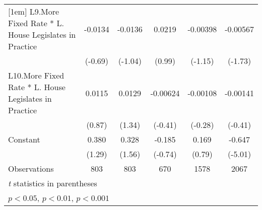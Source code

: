 {\begin{longtable}{l*{5}{c}}
[1em]
L9.More Fixed Rate * L. House Legislates in Practice&  -0.0134         &  -0.0136         &   0.0219         & -0.00398         & -0.00567         \\
                &  (-0.69)         &  (-1.04)         &   (0.99)         &  (-1.15)         &  (-1.73)         \\
[1em]
L10.More Fixed Rate * L. House Legislates in Practice&   0.0115         &   0.0129         & -0.00624         & -0.00108         & -0.00141         \\
                &   (0.87)         &   (1.34)         &  (-0.41)         &  (-0.28)         &  (-0.41)         \\
[1em]
Constant        &    0.380         &    0.328         &   -0.185         &    0.169         &   -0.647\sym{***}\\
                &   (1.29)         &   (1.56)         &  (-0.74)         &   (0.79)         &  (-5.01)         \\
\hline
Observations    &      803         &      803         &      670         &     1578         &     2067         \\
\hline\hline
\multicolumn{6}{l}{\footnotesize \textit{t} statistics in parentheses}\\
\multicolumn{6}{l}{\footnotesize \sym{*} \(p<0.05\), \sym{**} \(p<0.01\), \sym{***} \(p<0.001\)}\\
\end{longtable}
}
